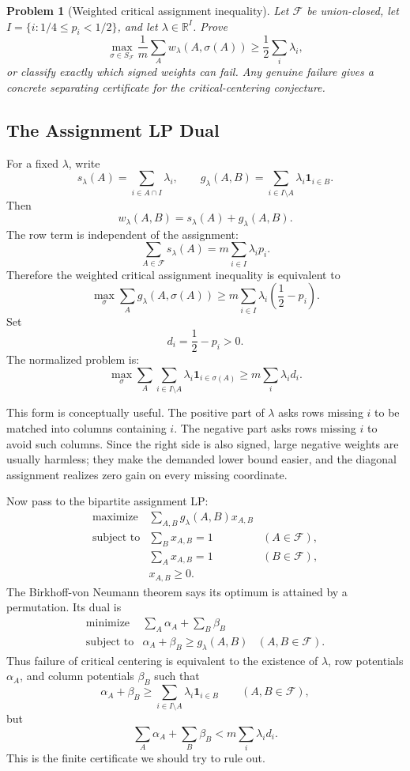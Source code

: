 \documentclass[11pt]{article}
\newtheorem{problem}{Problem}
\begin{document}
\begin{problem}[Weighted critical assignment inequality]
Let $\mathcal{F}$ be union-closed, let $I=\{i:1/4\le p_i<1/2\}$, and let
$\lambda\in\mathbb{R}^{I}$.  Prove
\[
  \max_{\sigma\in S_{\mathcal{F}}}
  \frac1m
  \sum_A w_\lambda(A,\sigma(A))
  \geq
  \frac12\sum_i\lambda_i,
\]
or classify exactly which signed weights can fail.  Any genuine failure gives
a concrete separating certificate for the critical-centering conjecture.
\end{problem}

\subsection{The Assignment LP Dual}

For a fixed $\lambda$, write
\[
  s_\lambda(A)=\sum_{i\in A\cap I}\lambda_i,
  \qquad
  g_\lambda(A,B)=\sum_{i\in I\setminus A}\lambda_i\mathbf{1}_{i\in B}.
\]
Then
\[
  w_\lambda(A,B)=s_\lambda(A)+g_\lambda(A,B).
\]
The row term is independent of the assignment:
\[
  \sum_{A\in\mathcal{F}}s_\lambda(A)
  =
  m\sum_{i\in I}\lambda_i p_i.
\]
Therefore the weighted critical assignment inequality is equivalent to
\[
  \max_{\sigma}
  \sum_A g_\lambda(A,\sigma(A))
  \geq
  m\sum_{i\in I}\lambda_i\left(\frac12-p_i\right).
\]
Set
\[
  d_i=\frac12-p_i>0.
\]
The normalized problem is:
\[
  \max_{\sigma}
  \sum_A
  \sum_{i\in I\setminus A}\lambda_i\mathbf{1}_{i\in\sigma(A)}
  \geq
  m\sum_i\lambda_i d_i.
\]

This form is conceptually useful.  The positive part of $\lambda$ asks rows
missing $i$ to be matched into columns containing $i$.  The negative part asks
rows missing $i$ to avoid such columns.  Since the right side is also signed,
large negative weights are usually harmless; they make the demanded lower
bound easier, and the diagonal assignment realizes zero gain on every missing
coordinate.

Now pass to the bipartite assignment LP:
\[
\begin{array}{rll}
  \text{maximize}
    & \displaystyle\sum_{A,B}g_\lambda(A,B)x_{A,B}\\[2mm]
  \text{subject to}
    & \displaystyle\sum_B x_{A,B}=1 & (A\in\mathcal{F}),\\[2mm]
    & \displaystyle\sum_A x_{A,B}=1 & (B\in\mathcal{F}),\\[2mm]
    & x_{A,B}\geq 0.
\end{array}
\]
The Birkhoff-von Neumann theorem says its optimum is attained by a
permutation.  Its dual is
\[
\begin{array}{rll}
  \text{minimize}
    & \displaystyle\sum_A \alpha_A+\sum_B\beta_B\\[2mm]
  \text{subject to}
    & \alpha_A+\beta_B\geq g_\lambda(A,B)
      & (A,B\in\mathcal{F}).
\end{array}
\]
Thus failure of critical centering is equivalent to the existence of
$\lambda$, row potentials $\alpha_A$, and column potentials $\beta_B$ such
that
\[
  \alpha_A+\beta_B
  \geq
  \sum_{i\in I\setminus A}\lambda_i\mathbf{1}_{i\in B}
  \qquad(A,B\in\mathcal{F}),
\]
but
\[
  \sum_A\alpha_A+\sum_B\beta_B
  <
  m\sum_i\lambda_i d_i.
\]
This is the finite certificate we should try to rule out.
\end{document}

